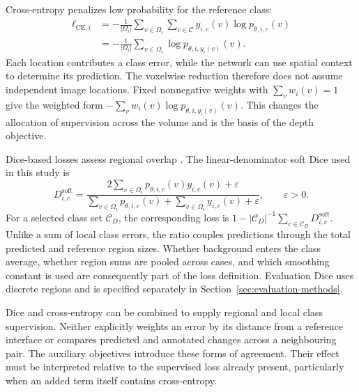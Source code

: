 \documentclass[12pt,a4paper]{article}
\begin{document}
Cross-entropy penalizes low probability for the reference class:
\begin{equation}
\begin{aligned}
\ell_{\mathrm{CE},i}
&=-\frac{1}{|\Omega_i|}\sum_{v\in\Omega_i}
  \sum_{c\in\mathcal{C}}y_{i,c}(v)\log p_{\theta,i,c}(v)\\
&=-\frac{1}{|\Omega_i|}\sum_{v\in\Omega_i}
  \log p_{\theta,i,y_i(v)}(v).
\end{aligned}
\label{eq:cross-entropy}
\end{equation}
Each location contributes a class error, while the network can use spatial
context to determine its prediction. The voxelwise reduction therefore
does not assume independent image locations. Fixed nonnegative weights
with $\sum_v w_i(v)=1$ give the weighted form
$-\sum_v w_i(v)\log p_{\theta,i,y_i(v)}(v)$. This changes the allocation
of supervision across the volume and is the basis of the depth objective.

Dice-based losses assess regional overlap \cite{milletari2016vnet}.
The linear-denominator soft Dice used in this study is
\begin{equation}
D_{i,c}^{\mathrm{soft}}=
\frac{2\sum_{v\in\Omega_i}p_{\theta,i,c}(v)y_{i,c}(v)+\varepsilon}
     {\sum_{v\in\Omega_i}p_{\theta,i,c}(v)
      +\sum_{v\in\Omega_i}y_{i,c}(v)+\varepsilon},
\qquad \varepsilon>0.
\label{eq:soft-dice}
\end{equation}
For a selected class set $\mathcal C_D$, the corresponding loss is
$1-|\mathcal C_D|^{-1}\sum_{c\in\mathcal C_D}D^{\mathrm{soft}}_{i,c}$.
Unlike a sum of local class errors, the ratio couples predictions through
the total predicted and reference region sizes. Whether background enters
the class average, whether region sums are pooled across cases, and which
smoothing constant is used are consequently part of the loss definition.
Evaluation Dice uses discrete regions and is specified separately in
Section~\ref{sec:evaluation-methods}.

Dice and cross-entropy can be combined to supply regional and local class
supervision. Neither explicitly weights an error by its distance from a
reference interface or compares predicted and annotated changes across
a neighbouring pair. The auxiliary objectives introduce these forms of
agreement. Their effect must be interpreted relative to the supervised
loss already present, particularly when an added term itself contains
cross-entropy.
\end{document}
